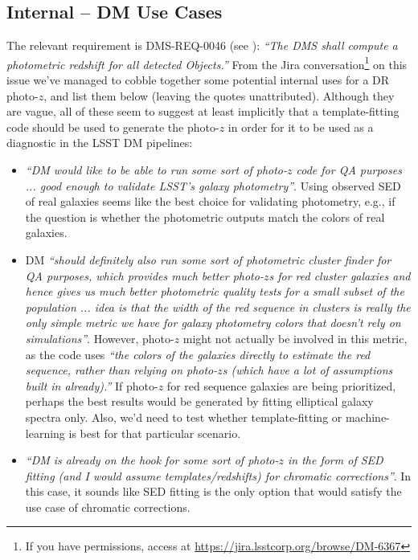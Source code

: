 \documentclass[DM,lsstdraft,toc]{lsstdoc}
\begin{document}
\subsection{Internal -- DM Use Cases}\label{ssec:motivation_internal}

The relevant requirement is DMS-REQ-0046 (see ): {\it ``The DMS shall compute a photometric redshift for all detected Objects.''} From the Jira conversation\footnote{If you have permissions, access at \url{https://jira.lsstcorp.org/browse/DM-6367}} on this issue we've managed to cobble together some potential internal uses for a DR photo-$z$, and list them below (leaving the quotes unattributed). Although they are vague, all of these seem to suggest at least implicitly that a template-fitting code should be used to generate the photo-$z$ in order for it to be used as a diagnostic in the LSST DM pipelines:
\begin{itemize}
\item {\it ``DM would like to be able to run some sort of photo-$z$ code for QA purposes ... good enough to validate LSST's galaxy photometry''}. Using observed SED of real galaxies seems like the best choice for validating photometry, e.g., if the question is whether the photometric outputs match the colors of real galaxies.
\item DM {\it ``should definitely also run some sort of photometric cluster finder for QA purposes, which provides much better photo-$z$s for red cluster galaxies and hence gives us much better photometric quality tests for a small subset of the population ... idea is that the width of the red sequence in clusters is really the only simple metric we have for galaxy photometry colors that doesn't rely on simulations''}. However, photo-$z$ might not actually be involved in this metric, as the code uses {\it ``the colors of the galaxies directly to estimate the red sequence, rather than relying on photo-$z$s (which have a lot of assumptions built in already).''} If photo-$z$ for red sequence galaxies are being prioritized, perhaps the best results would be generated by fitting elliptical galaxy spectra only. Also, we'd need to test whether template-fitting or machine-learning is best for that particular scenario.
\item {\it ``DM is already on the hook for some sort of photo-$z$ in the form of SED fitting (and I would assume templates/redshifts) for chromatic corrections''}. In this case, it sounds like SED fitting is the only option that would satisfy the use case of chromatic corrections.
\end{itemize}
\end{document}
